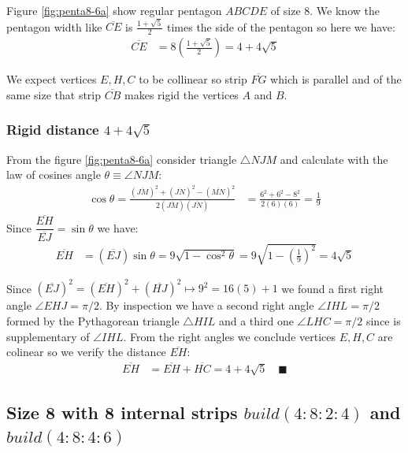 \documentclass[11pt]{article}
\begin{document}
Figure \ref{fig:penta8-6a} show regular pentagon $ABCDE$ of size 8. We know the pentagon width like $\overline{CE}$ is $\frac{1+\sqrt5}2$ times the side of the pentagon so here we have:
\begin{align}
\overline{CE} &= 8\left(\frac{1 + \sqrt5}2\right) = 4 + 4\sqrt5
\end{align}

We expect vertices $E,H,C$ to be collinear so strip $\overline{FG}$ which is parallel and of the same size that strip $\overline{CB}$ makes rigid the vertices $A$ and $B$.

\subsubsection{Rigid distance $4 + 4\sqrt5$}

From the figure \ref{fig:penta8-6a} consider triangle $\triangle{NJM}$ and calculate with the law of cosines angle $\theta \equiv \angle{NJM}$:
\begin{align}
\cos\theta = \frac{(\overline{JM})^2 + (\overline{JN})^2 
 - (\overline{MN})^2}{2(\overline{JM})(\overline{JN})}
 &= \frac{6^2 + 6^2 - 8^2}{2(6)(6)} = \frac{1}9
\end{align}
Since $\dfrac{\overline{EH}}{\overline{EJ}} = \sin\theta$ we have:
\begin{align}
\overline{EH} &= (\overline{EJ})\sin\theta
 = 9\sqrt{1-\cos^2\theta} 
 = 9\sqrt{1-\left(\frac{1}9\right)^2} = 4\sqrt5
\end{align}

Since $(\overline{EJ})^2 = (\overline{EH})^2 + (\overline{HJ})^2 \mapsto 9^2 = 16(5) + 1$ we found a first right angle $\angle{EHJ} = \pi / 2$. By inspection we have a second right angle $\angle{IHL} = \pi / 2$ formed by the Pythagorean triangle $\triangle{HIL}$ and a third one $\angle{LHC} = \pi / 2$ since is supplementary of $\angle{IHL}$. From the right angles we conclude vertices $E,H,C$ are colinear so we verify the distance $\overline{EH}$:
\begin{align}
\overline{EH} &= \overline{EH} + \overline{HC} = 4 + 4\sqrt{5} \quad \blacksquare
\end{align}

\subsection{Size 8 with 8 internal strips $build(4:8:2:4)$ and $build(4:8:4:6)$}
\end{document}
